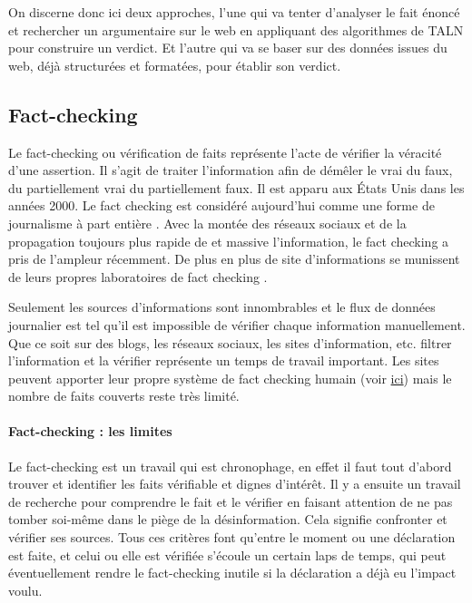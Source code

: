 On discerne donc ici deux approches, l'une qui va tenter d'analyser le fait énoncé et rechercher un argumentaire sur le web en appliquant des algorithmes de TALN pour construire un verdict. Et l'autre qui va se baser sur des données issues du web, déjà structurées et formatées, pour établir son verdict.

\subsection{Fact-checking}

Le fact-checking ou vérification de faits représente l'acte de vérifier la véracité d'une assertion. Il s'agit de traiter l'information afin de démêler le vrai du faux, du partiellement vrai du partiellement faux. Il est apparu aux États Unis dans les années 2000. Le fact checking est considéré aujourd'hui comme une forme de journalisme à part entière \cite{lemonde_fact_check_nouveaute_journalistique}. Avec la montée des réseaux sociaux et de la propagation toujours plus rapide de et massive l'information, le fact checking a pris de l'ampleur récemment. De plus en plus de site d'informations se munissent de leurs propres laboratoires de fact checking \cite{memoire_fact_check_nouveaute_journalistique}. 

Seulement les sources d'informations sont innombrables et le flux de données journalier est tel qu'il est impossible de vérifier chaque information manuellement. Que ce soit sur des blogs, les réseaux sociaux, les sites d'information, etc. filtrer l'information et la vérifier représente un temps de travail important. Les sites peuvent apporter leur propre système de fact checking humain (voir \href{http://decodeurs.blog.lemonde.fr/}{ici}) mais le nombre de faits couverts reste très limité.

\paragraph{Fact-checking : les limites}

Le fact-checking est un travail qui est chronophage, en effet il faut tout d'abord trouver et identifier les faits vérifiable et dignes d'intérêt. Il y a ensuite un travail de recherche pour comprendre le fait et le vérifier en faisant attention de ne pas tomber soi-même dans le piège de la désinformation. Cela signifie confronter et vérifier ses sources. 
Tous ces critères font qu'entre le moment ou une déclaration est faite, et celui ou elle est vérifiée s'écoule un certain laps de temps, qui peut éventuellement rendre le fact-checking inutile si la déclaration a déjà eu l'impact voulu.

